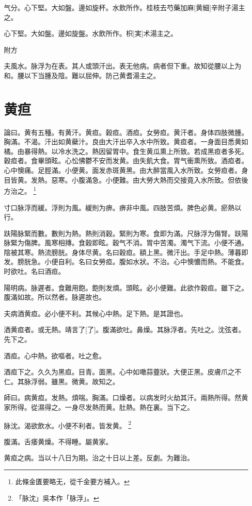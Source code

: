 \documentclass[12pt,twoside,UTF8,b5paper]{ctexbook}
\begin{document}
气分。心下堅。大如盤。邊如旋杯。水飲所作。桂枝去芍藥加麻[黄細]辛附子湯主之。

心下堅。大如盤。邊如旋盤。水飲所作。枳[実]术湯主之。

附方

夫風水。脉浮为在表。其人或頭汗出。表无他病。病者但下重。故知從腰以上为和。腰以下当腫及陰。難以屈伸。防己黄耆湯主之。

\chapter{黄疸}

論曰。黄有五種。有黄汗。黄疸。穀疸。酒疸。女勞疸。黄汗者。身体四肢微腫。胸滿。不渴。汗出如黄蘗汁。良由大汗出卒入水中所致。黄疸者。一身面目悉黄如橘。由暴得熱。以冷水洗之。熱因留胃中。食生黄瓜熏上所致。若成黑疸者多死。穀疸者。食畢頭眩。心忪怫鬱不安而发黄。由失飢大食。胃气衝熏所致。酒疸者。心中懊痛。足脛滿。小便黄。面发赤斑黄黑。由大醉當風入水所致。女勞疸者。身目皆黄。发熱。惡寒。小腹滿急。小便難。由大勞大熱而交接竟入水所致。但依後方治之。
	\footnote{此條金匱要略无，從千金要方補入。}

寸口脉浮而緩。浮則为風。緩則为痹。痹非中風。四肢苦煩。脾色必黄。瘀熱以行。

趺陽脉緊而數。數則为熱。熱則消穀。緊則为寒。食即为滿。尺脉浮为傷腎。趺陽脉緊为傷脾。風寒相摶。食穀即眩。穀气不消。胃中苦濁。濁气下流。小便不通。陰被其寒。熱流膀胱。身体尽黄。名曰穀疸。額上黑。微汗出。手足中熱。薄暮即发。膀胱急。小便自利。名曰女勞疸。腹如水狀。不治。心中懊憹而熱。不能食。时欲吐。名曰酒疸。

陽明病。脉遲者。食難用飽。飽則发煩。頭眩。必小便難。此欲作穀疸。雖下之。腹滿如故。所以然者。脉遲故也。

夫病酒黄疸。必小便不利。其候心中熱。足下熱。是其證也。

酒黄疸者。或无熱。靖言了[了]。腹滿欲吐。鼻燥。其脉浮者。先吐之。沈弦者。先下之。

酒疸。心中熱。欲嘔者。吐之愈。

酒疸下之。久久为黑疸。目青。面黑。心中如噉蒜虀狀。大便正黑。皮膚爪之不仁。其脉浮弱。雖黑。微黄。故知之。

師曰。病黄疸。发熱。煩喘。胸滿。口燥者。以病发时火劫其汗。兩熱所得。然黄家所得。從濕得之。一身尽发熱而黄。肚熱。熱在裏。当下之。

脉沈。渴欲飲水。小便不利者。皆发黄。
	\footnote{「脉沈」吳本作「脉浮」。}

腹滿。舌痿黄燥。不得睡。屬黄家。

黄疸之病。当以十八日为期。治之十日以上差。反劇。为難治。
\end{document}
